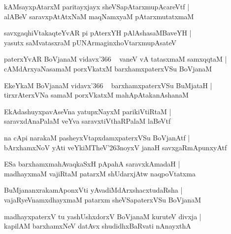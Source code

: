 \documentclass[twoside,12pt,openright]{book}
\def\S{\char'263}
\newcounter{shloka}[chapter]
\begin{document}
\begin{shloka}%
kAMsayxpAtarxM paritayxjayx sheVSapAtarxmupAcareVtf |\\
alABeV saravxpAtAtxNaM maqNamxyaM pAtarxmutatxmaM
\end{shloka}

\begin{shloka}%
savxgaqhiVtakaqteYvAR pi pAterxYH pAlAshasaMBaveYH |\\
yasutx saMvatasxraM pUNArmaginxhoVtarxmupAsateV 
\end{shloka}

\begin{shloka}%
paterxYvAR BoVjanaM vidavx\char'366 ~ vaneV vA tatasxmaM samxqqtaM |\\
cAMdArxyaNasamaM porxVkatxM barxhamxpaterxVSu BoVjanaM
\end{shloka}

\begin{shloka}%
EkeYkaM BoVjanaM vidavx\char'366 ~ barxhamxpaterxVSu BuMjataH |\\
tirxrAterxVNa samaM porxVkatxM mahApAtakanAshanaM
\end{shloka}

\begin{shloka}%
EkAdashuyxpavAseVna yatupxNayxM parikiVtiRtaM |\\
saravxdAnaPalaM veYva saravxtiVthaRPalaM laBeVtf 
\end{shloka}

\begin{shloka}%
na cApi narakaM pasheyxVtapxdamxpaterxVSu BoVjanAtf |\\
bArxhamxNoV yAti veYkiMTheV\S noyxV janaH savxgaRmApunxyAtf
\end{shloka}

\begin{shloka}%
ESa barxhamxmahAvaqkaSxH pApahA saravxkAmadaH |\\
madhayxmaM vajiRtaM patarxM shUdarxjAtw naqpoVtatxma 
\end{shloka}

\begin{shloka}%
BuMjananxrakamAponxVti yAvadiMdArxshacxtudaRsha |\\
vajaRyeVnamxdhayxmaM patarxm sheVSapaterxVSu BoVjanaM 
\end{shloka}

\begin{shloka}%
madhayxpaterxV tu yashUshxdorxV BoVjanaM kuruteV divxja |\\
kapilAM barxhamxNeV datAvx shudidhxBaRvati nAnayxthA
\end{shloka}
\end{document}
